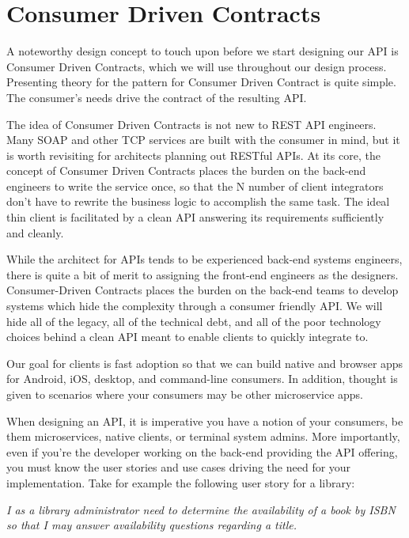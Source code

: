 

\section{Consumer Driven Contracts}

A noteworthy design concept to touch upon before we start designing our API is Consumer Driven Contracts, which we will use throughout our design process.  Presenting theory for the pattern for Consumer Driven Contract is quite simple.  The consumer's needs drive the contract of the resulting API.

The idea of Consumer Driven Contracts is not new to REST API engineers.  Many SOAP and other TCP services are built with the consumer in mind, but it is worth revisiting for architects planning out RESTful APIs.  At its core, the concept of Consumer Driven Contracts places the burden on the back-end engineers to write the service once, so that the N number of client integrators don't have to rewrite the business logic to accomplish the same task.  The ideal thin client is facilitated by a clean API answering its requirements sufficiently and cleanly.

While the architect for APIs tends to be experienced back-end systems engineers, there is quite a bit of merit to assigning the front-end engineers as the designers. Consumer-Driven Contracts places the burden on the back-end teams to develop systems which hide the complexity through a consumer friendly API. We will hide all of the legacy, all of the technical debt, and all of the poor technology choices behind a clean API meant to enable clients to quickly integrate to.

Our goal for clients is fast adoption so that we can build native and browser apps for Android, iOS, desktop, and command-line consumers.  In addition, thought is given to scenarios where your consumers may be other microservice apps.

When designing an API, it is imperative you have a notion of your consumers, be them microservices, native clients, or terminal system admins.  More importantly, even if you're the developer working on the back-end providing the API offering, you must know the user stories and use cases driving the need for your implementation. Take for example the following user story for a library:

\textit{I as a library administrator need to determine the availability of a book by ISBN so that I may answer availability questions regarding a title.}

